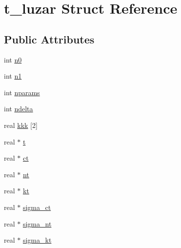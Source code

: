 \hypertarget{structt__luzar}{\section{t\-\_\-luzar \-Struct \-Reference}
\label{structt__luzar}
}
\subsection*{\-Public \-Attributes}
\begin{DoxyCompactItemize}
\item 
int \hyperlink{structt__luzar_a643e679f7382670865eb62119fa6fa87}{n0}
\item 
int \hyperlink{structt__luzar_a9475536964b665804ab06f08d6ef5610}{n1}
\item 
int \hyperlink{structt__luzar_ad33be09e400d85fb6a8785cbd041427e}{nparams}
\item 
int \hyperlink{structt__luzar_a0bc1cb5d9e804b61a940e9c68bfa10ab}{ndelta}
\item 
real \hyperlink{structt__luzar_ab4615e40a681113ac0a6294706158e7b}{kkk} \mbox{[}2\mbox{]}
\item 
real $\ast$ \hyperlink{structt__luzar_a0b4eb323584bb4af61b7aa25ad87119e}{t}
\item 
real $\ast$ \hyperlink{structt__luzar_a07e593b6b8012ce0de2988d27e1870cf}{ct}
\item 
real $\ast$ \hyperlink{structt__luzar_a6e5b00bc4ab6c2cb9e3fdb099cbf80fd}{nt}
\item 
real $\ast$ \hyperlink{structt__luzar_aeacceb1a346575e3587f4e7f547ee2a3}{kt}
\item 
real $\ast$ \hyperlink{structt__luzar_a93cc8a49596f9e834f81f80d03f44760}{sigma\-\_\-ct}
\item 
real $\ast$ \hyperlink{structt__luzar_a0b1a727979b43de0be3d501e0c77b14d}{sigma\-\_\-nt}
\item 
real $\ast$ \hyperlink{structt__luzar_acfb3d4064870e19cf4a89a34f318115c}{sigma\-\_\-kt}
\end{DoxyCompactItemize}


